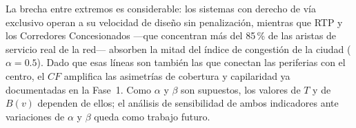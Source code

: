 La brecha entre extremos es considerable: los sistemas con derecho de vía
exclusivo operan a su velocidad de diseño sin penalización, mientras que RTP y
los Corredores Concesionados —que concentran más del 85\,\% de las aristas de
servicio real de la red— absorben la mitad del índice de congestión de la ciudad
($\alpha = 0.5$). Dado que esas líneas son también las que conectan las
periferias con el centro, el $CF$ amplifica las asimetrías de cobertura y
capilaridad ya documentadas en la Fase~1. Como $\alpha$ y $\beta$ son supuestos,
los valores de $T$ y de $B(v)$ dependen de ellos; el análisis de sensibilidad de
ambos indicadores ante variaciones de $\alpha$ y $\beta$ queda como trabajo
futuro.
